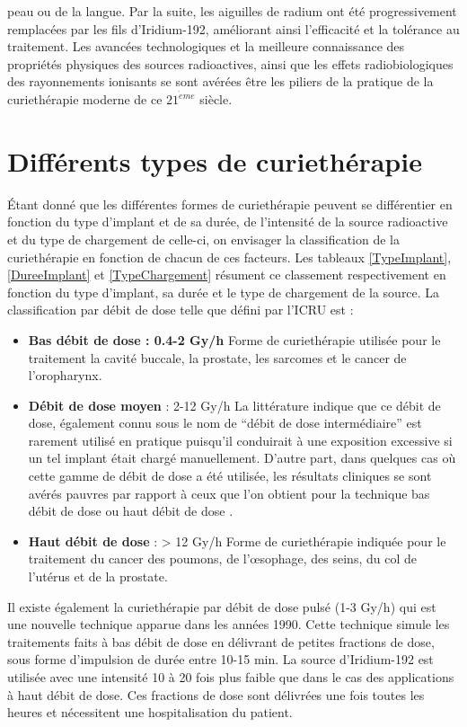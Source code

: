 peau ou de la langue. Par la suite, les aiguilles de radium ont été progressivement remplacées par les fils d'Iridium-192, améliorant ainsi l’efficacité et la tolérance au traitement. Les avancées technologiques et la meilleure connaissance des propriétés physiques des sources radioactives, ainsi que les effets radiobiologiques des rayonnements ionisants se sont avérées être les piliers de la pratique de la curiethérapie moderne de ce $21^{\grave{e}me}$ siècle.
%
\section{Différents types de curiethérapie}
Étant donné que les différentes formes de curiethérapie peuvent se différentier en fonction du type d’implant et de sa durée, de l’intensité de la source radioactive et du type de chargement de celle-ci, on envisager la classification de la curiethérapie en fonction de chacun de ces facteurs. Les tableaux \ref{TypeImplant}, \ref{DureeImplant} et  \ref{TypeChargement} résument ce classement respectivement en fonction du type d’implant, sa durée et le type de chargement de la source. La classification par débit de dose telle que défini par l’ICRU  \cite{ICRU} est :
%
\begin{itemize}[label=\textbullet, font=\LARGE]
\item \textbf{Bas débit de dose : 0.4-2 Gy/h}\newline
Forme de curiethérapie utilisée pour le traitement la cavité buccale, la prostate, les sarcomes et le cancer de l’oropharynx.
%
\item \textbf{Débit de dose moyen} : 2-12 Gy/h\newline
La littérature indique que ce débit de dose, également connu sous le nom de \enquote{débit de dose intermédiaire} est rarement utilisé en pratique puisqu’il conduirait à une exposition excessive si un tel implant était chargé manuellement. D’autre part, dans quelques cas où cette gamme de débit de dose a été utilisée, les résultats cliniques se sont avérés pauvres par rapport à ceux que l’on obtient pour la technique bas débit de dose ou haut débit de dose \cite{Podgorsak}.
%
\item \textbf{Haut débit de dose} : > 12 Gy/h \newline
Forme de curiethérapie indiquée pour le traitement du cancer des poumons, de l’œsophage, des seins, du col de l’utérus et de la prostate.
\end{itemize}
%
Il existe également la curiethérapie par débit de dose pulsé (1-3 Gy/h) qui est une nouvelle technique apparue dans les années 1990. Cette technique simule les traitements faits à bas débit de dose en délivrant de petites fractions de dose, sous forme d’impulsion de durée entre 10-15 min. La source d’Iridium-192 est utilisée avec une intensité 10 à 20 fois plus faible que dans le cas des applications à haut débit de dose. Ces fractions de dose sont délivrées une fois toutes les heures et nécessitent une hospitalisation du patient.\newline

